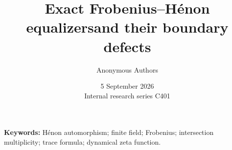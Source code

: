 \documentclass[11pt]{article}
\title{Exact Frobenius--H\'enon equalizers\newline and their boundary defects}
\author{Anonymous Authors}
\date{5 September 2026\\[3pt]{\small Internal research series C401}}
\begin{document}
\maketitle
\begin{abstract}

\end{abstract}
\noindent\textbf{Keywords:} H\'enon automorphism; finite field; Frobenius;
intersection multiplicity; trace formula; dynamical zeta function.











\end{document}
